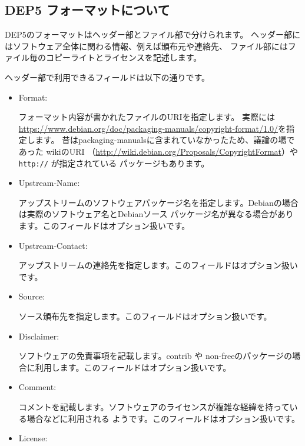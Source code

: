 \documentclass[mingoth,a4paper]{jsarticle}
\begin{document}
\subsection{DEP5 フォーマットについて}

DEP5のフォーマットはヘッダー部とファイル部で分けられます。
ヘッダー部にはソフトウェア全体に関わる情報、例えば頒布元や連絡先、
ファイル部にはファイル毎のコピーライトとライセンスを記述します。

ヘッダー部で利用できるフィールドは以下の通りです。
\begin{itemize}

  \item Format:

        フォーマット内容が書かれたファイルのURIを指定します。
        実際には\url{https://www.debian.org/doc/packaging-manuals/copyright-format/1.0/}を指定します。
        昔はpackaging-manualsに含まれていなかったため、議論の場であった wikiのURI
        （\url{http://wiki.debian.org/Proposals/CopyrightFormat}）や\texttt{http://} が指定されている
        パッケージもあります。

  \item Upstream-Name:

        アップストリームのソフトウェアパッケージ名を指定します。Debianの場合は実際のソフトウェア名とDebianソース
        パッケージ名が異なる場合があります。このフィールドはオプション扱いです。

  \item Upstream-Contact:

        アップストリームの連絡先を指定します。このフィールドはオプション扱いです。

  \item Source:

        ソース頒布先を指定します。このフィールドはオプション扱いです。

  \item  Disclaimer:

        ソフトウェアの免責事項を記載します。contrib や non-freeのパッケージの場合に利用します。このフィールドはオプション扱いです。

  \item  Comment:

        コメントを記載します。ソフトウェアのライセンスが複雑な経緯を持っている場合などに利用される
        ようです。このフィールドはオプション扱いです。

  \item  License:


\end{itemize}
\end{document}
